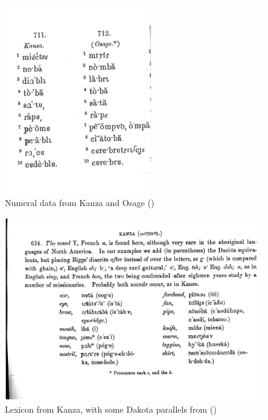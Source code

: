\documentclass[output=paper]{LSP/langsci}
\begin{document}
\begin{figure}
\centering
\caption{Numeral data from {Kanza} and {Osage} (\citealt[146, \S711, 712]{Haldeman1860})} \label{haldemannumerals}
\includegraphics[width=2.5in,angle=-2]{figures/GrantNumerals}
\end{figure}

\begin{figure}
\centering
 
\caption{Lexicon from {Kanza}, with some {Dakota} parallels from \citet{Riggs1852}  (\citealt[135, \S634]{Haldeman1860})} \label{haldemanlexicon}
\includegraphics[width=5in]{figures/GrantKanzaWords}
\end{figure}
\end{document}
